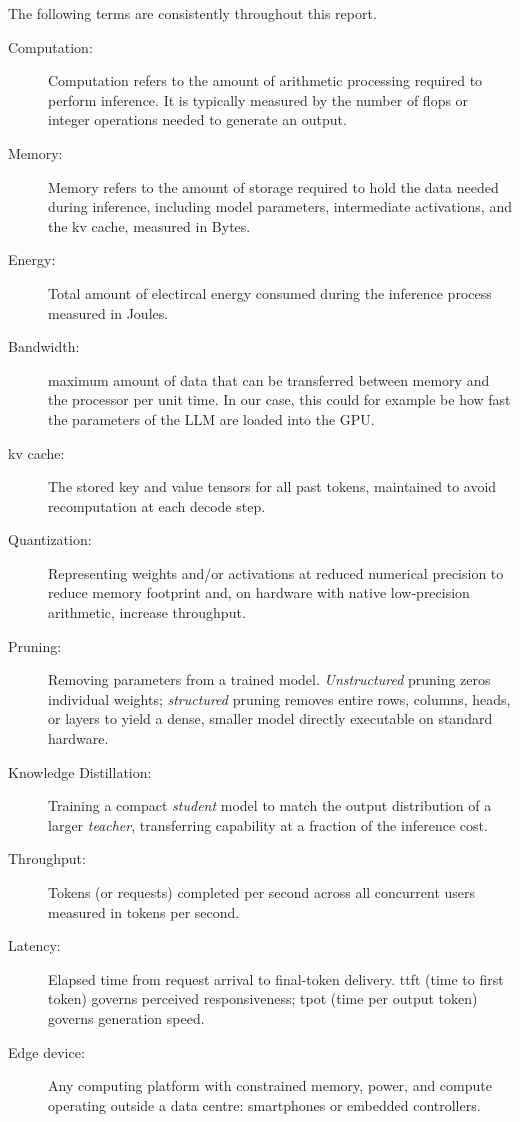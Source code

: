 The following terms are consistently throughout this report.

\begin{description}
  \item[Computation:] Computation refers to the amount of arithmetic processing required to perform inference. It is typically measured by the number of \ac{flops} or integer operations needed to generate an output.
  \item[Memory:] Memory refers to the amount of storage required to hold the data needed during inference, including model parameters, intermediate activations, and the \ac{kv} cache, measured in Bytes.
  \item[Energy:] Total amount of electircal energy consumed during the inference process measured in Joules.
  \item[Bandwidth:] maximum amount of data that can be transferred between memory and the processor per unit time. In our case, this could for example be how fast the parameters of the LLM are loaded into the GPU.
  \item[\ac{kv} cache:] The stored key and value tensors for all past tokens, maintained to avoid recomputation at each decode step.
  \item[Quantization:] Representing weights and/or activations at reduced numerical precision to reduce memory footprint and, on hardware with native low-precision arithmetic, increase throughput.
  \item[Pruning:] Removing parameters from a trained model. \emph{Unstructured} pruning zeros individual weights; \emph{structured} pruning removes entire rows, columns, heads, or layers to yield a dense, smaller model directly executable on standard hardware.
  \item[Knowledge Distillation:] Training a compact \emph{student} model to match the output distribution of a larger \emph{teacher}, transferring capability at a fraction of the inference cost.
  \item[Throughput:] Tokens (or requests) completed per second across all concurrent users measured in tokens per second.
  \item[Latency:] Elapsed time from request arrival to final-token delivery. \ac{ttft} (time to first token) governs perceived responsiveness; \ac{tpot} (time per output token) governs generation speed.
  \item[Edge device:] Any computing platform with constrained memory, power, and compute operating outside a data centre: smartphones or embedded controllers.
\end{description}

